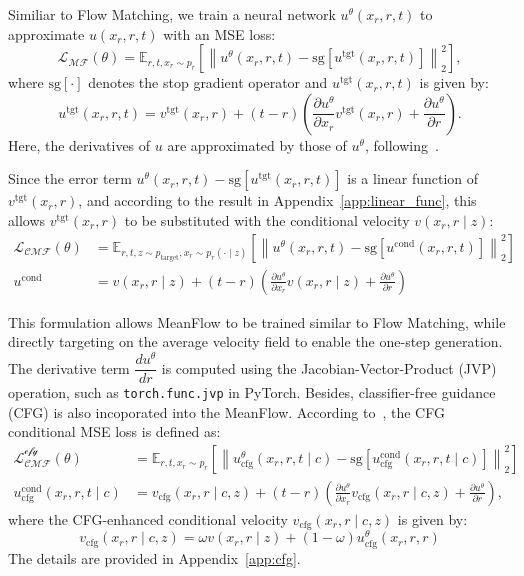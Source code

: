 Similiar to Flow Matching, we train a neural network $u^\theta(x_r, r, t)$ to approximate $u(x_r, r, t)$ with an MSE loss:
\begin{equation}
  \mathcal{L_\text{MF}} (\theta) = \mathbb{E}_{r, t, x_r \sim p_r} \left[ \left\| u^\theta(x_r, r, t) - \text{sg} \left[u^\text{tgt} (x_r, r, t)\right] \right\|_2^2 \right],
\end{equation}
%
where $\text{sg}\left[ \cdot \right]$ denotes the stop gradient operator and $u^\text{tgt}(x_r, r, t)$ is given by:
\begin{equation}\label{mf_basic_eq}
  u^\text{tgt} (x_r, r, t) =  v^\text{tgt}(x_r, r) + (t - r) \left( \frac{\partial u^\theta}{\partial x_r} v^\text{tgt}(x_r, r) + \frac{\partial u^\theta}{\partial r}\right).
\end{equation}
%
Here, the derivatives of $u$ are approximated by those of $u^\theta$, following~\cite{meanflow}.

Since the error term $u^\theta(x_r, r, t) - \text{sg} \left[u^\text{tgt} (x_r, r, t) \right]$ is a linear function of $v^\text{tgt}(x_r, r)$, and according to the result in Appendix~\ref{app:linear_func}, this allows $v^\text{tgt}(x_r, r)$ to be substituted with the conditional velocity $v(x_r, r \mid z)$:
%
\begin{align}
   \mathcal{L_\text{CMF}} (\theta) &= \mathbb{E}_{r, t, z \sim p_\text{target}, x_r \sim p_r(\cdot \mid z)} \left[ \left\| u^\theta(x_r, r, t) - \text{sg} \left[u^\text{cond} (x_r, r, t) \right] \right\|_2^2 \right] \\
   u^\text{cond} &=  v(x_r, r \mid z) + (t - r) \left( \frac{\partial u^\theta}{\partial x_r} v(x_r, r \mid z) + \frac{\partial u^\theta}{\partial r} \right)
\end{align}

This formulation allows MeanFlow to be trained similar to Flow Matching, while directly targeting on the average velocity field to enable the one-step generation. The derivative term $\dfrac{d u^\theta}{d r}$ is computed using the Jacobian-Vector-Product (JVP) operation, such as \texttt{torch.func.jvp} in PyTorch. Besides, classifier-free guidance (CFG) is also incoporated into the MeanFlow. According to~\cite{meanflow}, the CFG conditional MSE loss is defined as:
%
\begin{align}
  \mathcal{L_\text{CMF}^\text{cfg}} (\theta) &= \mathbb{E}_{r, t, x_r \sim p_r} \left[ \left\| u_\text{cfg}^\theta(x_r, r, t \mid c) - \text{sg} \left[u_\text{cfg}^\text{cond} (x_r, r, t \mid c)\right] \right\|_2^2 \right] \\
  u_\text{cfg}^\text{cond} (x_r, r, t \mid c) &= v_\text{cfg}(x_r, r \mid c, z) + (t - r) \left( \frac{\partial u^\theta}{\partial x_r} v_\text{cfg}(x_r, r \mid c, z) + \frac{\partial u^\theta}{\partial r} \right), \label{mf_cfg_tgt}
\end{align}
%
where the CFG-enhanced conditional velocity $v_\text{cfg} (x_r, r \mid c, z)$ is given by:
%
\begin{equation}\label{v_cond_cfg}
  v_\text{cfg} (x_r, r \mid c, z) = \omega v(x_r, r \mid z) + (1 - \omega) u_\text{cfg}^\theta (x_r, r, r)
\end{equation}
%
The details are provided in Appendix~\ref{app:cfg}.



